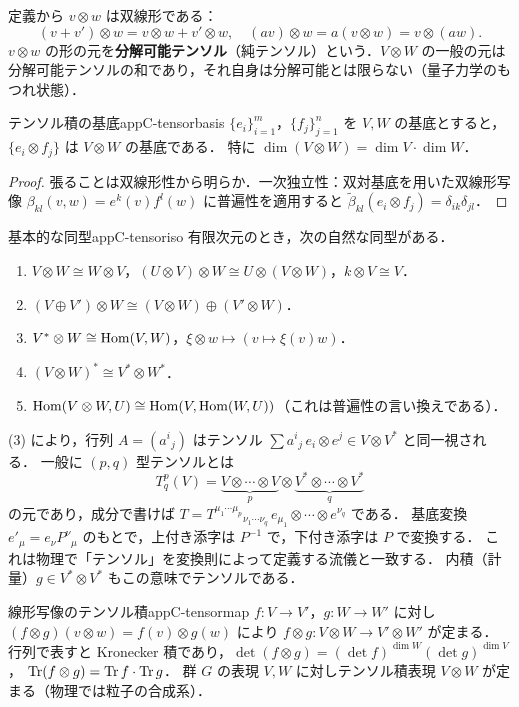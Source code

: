 定義から $v\otimes w$ は双線形である：
\[
(v+v')\otimes w=v\otimes w+v'\otimes w,\quad (av)\otimes w=a(v\otimes w)=v\otimes(aw).
\]
$v\otimes w$ の形の元を\textbf{分解可能テンソル}（純テンソル）という．$V\otimes W$ の一般の元は
分解可能テンソルの和であり，それ自身は分解可能とは限らない（量子力学のもつれ状態）．

\begin{myprop}{テンソル積の基底}{appC-tensorbasis}
$\{e_i\}_{i=1}^m$，$\{f_j\}_{j=1}^n$ を $V,W$ の基底とすると，$\{e_i\otimes f_j\}$ は $V\otimes W$ の基底である．
特に $\dim(V\otimes W)=\dim V\cdot\dim W$．
\end{myprop}
\begin{proof}
張ることは双線形性から明らか．一次独立性：双対基底を用いた双線形写像
$\beta_{kl}(v,w)=e^k(v)f^l(w)$ に普遍性を適用すると $\tilde\beta_{kl}(e_i\otimes f_j)=\delta_{ik}\delta_{jl}$．
\end{proof}

\begin{myprop}{基本的な同型}{appC-tensoriso}
有限次元のとき，次の自然な同型がある．
\begin{enumerate}
\item $V\otimes W\cong W\otimes V$，$(U\otimes V)\otimes W\cong U\otimes(V\otimes W)$，$k\otimes V\cong V$．
\item $(V\oplus V')\otimes W\cong(V\otimes W)\oplus(V'\otimes W)$．
\item $V^*\otimes W\cong\operatorname{Hom}(V,W)$，$\xi\otimes w\mapsto(v\mapsto\xi(v)w)$．
\item $(V\otimes W)^*\cong V^*\otimes W^*$．
\item $\operatorname{Hom}(V\otimes W,U)\cong\operatorname{Hom}(V,\operatorname{Hom}(W,U))$（これは普遍性の言い換えである）．
\end{enumerate}
\end{myprop}

(3) により，行列 $A=(a^i{}_j)$ はテンソル $\sum a^i{}_j\,e_i\otimes e^j\in V\otimes V^*$ と同一視される．
一般に $(p,q)$ 型テンソルとは
\[
T^p_q(V)=\underbrace{V\otimes\cdots\otimes V}_{p}\otimes\underbrace{V^*\otimes\cdots\otimes V^*}_{q}
\]
の元であり，成分で書けば $T=T^{\mu_1\cdots\mu_p}{}_{\nu_1\cdots\nu_q}\,e_{\mu_1}\otimes\cdots\otimes e^{\nu_q}$ である．
基底変換 $e'_\mu=e_\nu P^\nu{}_\mu$ のもとで，上付き添字は $P^{-1}$ で，下付き添字は $P$ で変換する．
これは物理で「テンソル」を変換則によって定義する流儀と一致する．
内積（計量）$g\in V^*\otimes V^*$ もこの意味でテンソルである．

\begin{myex}{線形写像のテンソル積}{appC-tensormap}
$f\colon V\to V'$，$g\colon W\to W'$ に対し $(f\otimes g)(v\otimes w)=f(v)\otimes g(w)$ により
$f\otimes g\colon V\otimes W\to V'\otimes W'$ が定まる．
行列で表すと Kronecker 積であり，$\det(f\otimes g)=(\det f)^{\dim W}(\det g)^{\dim V}$，
$\operatorname{Tr}(f\otimes g)=\operatorname{Tr} f\cdot\operatorname{Tr} g$．
群 $G$ の表現 $V,W$ に対しテンソル積表現 $V\otimes W$ が定まる（物理では粒子の合成系）．
\end{myex}

